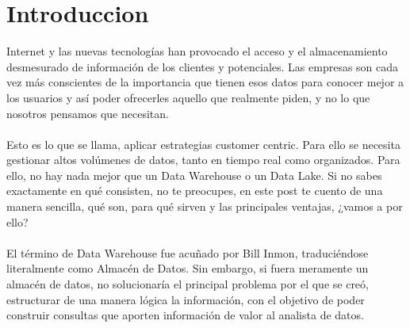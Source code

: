 \newpage

\section{Introduccion}
\item{Internet y las nuevas tecnologías han provocado el acceso y el almacenamiento desmesurado de información de los clientes y potenciales. Las empresas son cada vez más conscientes de la importancia que tienen esos datos para conocer mejor a los usuarios y así poder ofrecerles aquello que realmente piden, y no lo que nosotros pensamos que necesitan.\\\\
Esto es lo que se llama, aplicar estrategias customer centric. Para ello se necesita gestionar altos volúmenes de datos, tanto en tiempo real como organizados. Para ello, no hay nada mejor que un Data Warehouse o un Data Lake. Si no sabes exactamente en qué consisten, no te preocupes, en este post te cuento de una manera sencilla, qué son, para qué sirven y las principales ventajas, ¿vamos a por ello?\\\\
El término de Data Warehouse fue acuñado por Bill Inmon, traduciéndose literalmente como Almacén de Datos. Sin embargo, si fuera meramente un almacén de datos, no solucionaría el principal problema por el que se creó, estructurar de una manera lógica la información, con el objetivo de poder construir consultas que aporten información de valor al analista de datos.}

\newpage


